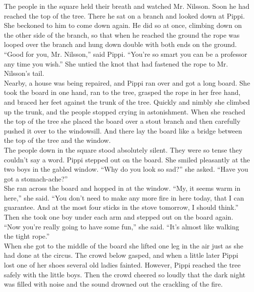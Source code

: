 \documentclass{standard}
\begin{document}
The people in the square held their breath and watched Mr. Nilsson. Soon he had reached the top of the tree. There he sat on a branch and looked down at Pippi. She beckoned to him to come down again. He did so at once, climbing down on the other side of the branch, so that when he reached the ground the rope was looped over the branch and hung down double with both ends on the ground.\\

“Good for you, Mr. Nilsson,” said Pippi. “You’re so smart you can be a professor any time you wish.” She untied the knot that had fastened the rope to Mr. Nilsson’s tail.\\

Nearby, a house was being repaired, and Pippi ran over and got a long board. She took the board in one hand, ran to the tree, grasped the rope in her free hand, and braced her feet against the trunk of the tree. Quickly and nimbly she climbed up the trunk, and the people stopped crying in astonishment. When she reached the top of the tree she placed the board over a stout branch and then carefully pushed it over to the windowsill. And there lay the board like a bridge between the top of the tree and the window.\\

The people down in the square stood absolutely silent. They were so tense they couldn’t say a word. Pippi stepped out on the board. She smiled pleasantly at the two boys in the gabled window. “Why do you look so sad?” she asked. “Have you got a stomach-ache?”\\

She ran across the board and hopped in at the window. “My, it seems warm in here,” she said. “You don’t need to make any more fire in here today, that I can guarantee. And at the most four sticks in the stove tomorrow, I should think.”\\

Then she took one boy under each arm and stepped out on the board again.\\

“Now you’re really going to have some fun,” she said. “It’s almost like walking the tight rope.”\\

When she got to the middle of the board she lifted one leg in the air just as she had done at the circus. The crowd below gasped, and when a little later Pippi lost one of her shoes several old ladies fainted. However, Pippi reached the tree safely with the little boys. Then the crowd cheered so loudly that the dark night was filled with noise and the sound drowned out the crackling of the fire.\\
\end{document}

